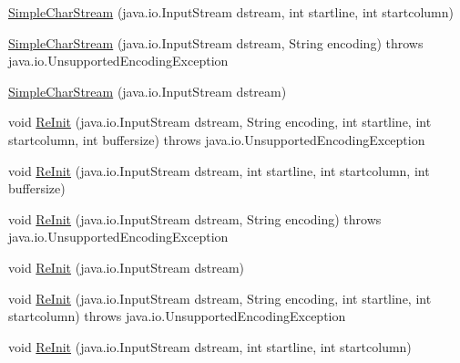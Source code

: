 \begin{DoxyCompactItemize}
\item 
\hyperlink{classpack_1_1_simple_char_stream_a3f10b462cc92265e9906c9665cdc1261}{Simple\+Char\+Stream} (java.\+io.\+Input\+Stream dstream, int startline, int startcolumn)
\item 
\hyperlink{classpack_1_1_simple_char_stream_a3e525a26cf741928388f8f0e819ba964}{Simple\+Char\+Stream} (java.\+io.\+Input\+Stream dstream, String encoding)  throws java.\+io.\+Unsupported\+Encoding\+Exception   
\item 
\hyperlink{classpack_1_1_simple_char_stream_ac8ccfa8fd0274563331b5937b9f83ecb}{Simple\+Char\+Stream} (java.\+io.\+Input\+Stream dstream)
\item 
void \hyperlink{classpack_1_1_simple_char_stream_a078678c630a49ca81652a48e920344d5}{Re\+Init} (java.\+io.\+Input\+Stream dstream, String encoding, int startline, int startcolumn, int buffersize)  throws java.\+io.\+Unsupported\+Encoding\+Exception   
\item 
void \hyperlink{classpack_1_1_simple_char_stream_a36c3e9e4d778d9dae4545615b43c0b07}{Re\+Init} (java.\+io.\+Input\+Stream dstream, int startline, int startcolumn, int buffersize)
\item 
void \hyperlink{classpack_1_1_simple_char_stream_ab9b39473f43d9c17d39328351007f0d1}{Re\+Init} (java.\+io.\+Input\+Stream dstream, String encoding)  throws java.\+io.\+Unsupported\+Encoding\+Exception   
\item 
void \hyperlink{classpack_1_1_simple_char_stream_a468249d6337559f0f42137b539478c72}{Re\+Init} (java.\+io.\+Input\+Stream dstream)
\item 
void \hyperlink{classpack_1_1_simple_char_stream_a724c1cd6f8abdfec2b01a0fd4d345a99}{Re\+Init} (java.\+io.\+Input\+Stream dstream, String encoding, int startline, int startcolumn)  throws java.\+io.\+Unsupported\+Encoding\+Exception   
\item 
void \hyperlink{classpack_1_1_simple_char_stream_a7bcb74cf3d69d6f699fca5e7a2b0f8bb}{Re\+Init} (java.\+io.\+Input\+Stream dstream, int startline, int startcolumn)
\end{DoxyCompactItemize}
